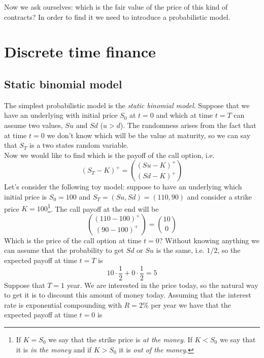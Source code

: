 Now we ask ourselves: which is the fair value of the price of this kind of contracts? In order to find it we need to introduce a probabilistic model. 

\chapter{Discrete time finance}
\section{Static binomial model}
The simplest probabilistic model is the \emph{static binomial model}. Suppose that we have an underlying with initial price $S_0$ at $t=0$ and which at time $t=T$ can assume two values, $Su$ and $Sd$ ($u>d$). The randomness arises from the fact that at time $t=0$ we don't know which will be the value at maturity, so we can say that $S_T$ is a two states random variable. \\
Now we would like to find which is the payoff of the call option, i.e.
\begin{equation}
    (S_T-K)^+ = \binom{(Su-K)^+}{(Sd-K)^+}
\end{equation}
Let's consider the following toy model: suppose to have an underlying which initial price is $S_0=100$ and $S_T=(Su,Sd)=(110,90)$ and consider a strike price $K=100$\footnote{If $K=S_0$ we say that the strike price is \emph{at the money}. If $K<S_0$ we say that it is \emph{in the money} and if $K>S_0$ it is \emph{out of the money}.}. The call payoff at the end will be
\begin{equation*}
    \binom{(110-100)^+}{(90-100)^+}=\binom{10}{0}
\end{equation*}
Which is the price of the call option at time $t=0$? Without knowing anything we can assume that the probability to get $Sd$ or $Su$ is the same, i.e. $1/2$, so the expected payoff at time $t=T$ is
\begin{equation*}
    10\cdot\dfrac{1}{2} + 0\cdot\dfrac{1}{2} = 5
\end{equation*}
Suppose that $T=1$ year. We are interested in the price today, so the natural way to get it is to discount this amount of money today. Assuming that the interest rate is exponential compounding with $R=2\%$ per year we have that the expected payoff at time $t=0$ is
